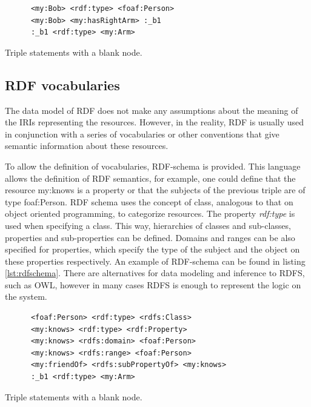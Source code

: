 \begin{listing}\centering
  \begin{minipage}{.6\textwidth}
    \begin{verbatim}
      <my:Bob> <rdf:type> <foaf:Person> 
      <my:Bob> <my:hasRightArm> :_b1
      :_b1 <rdf:type> <my:Arm>
    \end{verbatim}
  \end{minipage}
  \caption{Triple statements with a blank node.}\label{lst:triplesblanknode}
\end{listing}

\subsection*{RDF vocabularies}\label{ssec:rdfvocabularies}

The data model of RDF does not make any assumptions about the meaning of the IRIs representing the resources. However, in the reality, RDF is usually used in conjunction with a series of vocabularies or other conventions that give semantic information about these resources.

To allow the definition of vocabularies, RDF-schema\cite{rdfschema} is provided. This language allows the definition of RDF semantics, for example, one could define that the resource my:knows is a property or that the subjects of the previous triple are of type foaf:Person. RDF schema uses the concept of class, analogous to that on object oriented programming, to categorize resources. The property \textit{rdf:type} is used when specifying a class. This way, hierarchies of classes and sub-classes, properties and sub-properties can be defined. Domains and ranges can be also specified for properties, which specify the type of the subject and the object on these properties respectively. An example of RDF-schema can be found in listing \ref{lst:rdfschema}. There are alternatives for data modeling and inference to RDFS, such as OWL, however in many cases RDFS is enough to represent the logic on the system.

\begin{listing}\centering
  \begin{minipage}{.6\textwidth}
    \begin{verbatim}
      <foaf:Person> <rdf:type> <rdfs:Class> 
      <my:knows> <rdf:type> <rdf:Property>
      <my:knows> <rdfs:domain> <foaf:Person>
      <my:knows> <rdfs:range> <foaf:Person>
      <my:friendOf> <rdfs:subPropertyOf> <my:knows>
      :_b1 <rdf:type> <my:Arm>
    \end{verbatim}
  \end{minipage}
  \caption{Triple statements with a blank node.}\label{lst:rdfschema}
\end{listing}

